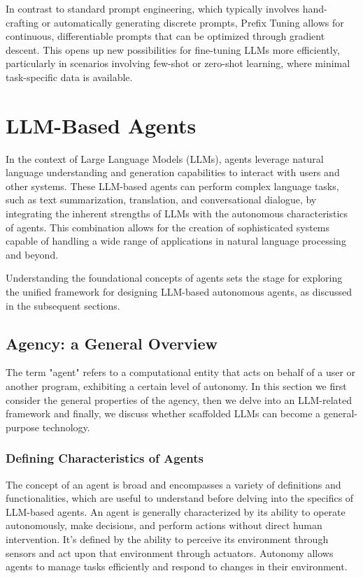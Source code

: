 In contrast to standard prompt engineering, which typically involves hand-crafting or automatically generating discrete prompts, Prefix Tuning allows for continuous, differentiable prompts that can be optimized through gradient descent. This opens up new possibilities for fine-tuning LLMs more efficiently, particularly in scenarios involving few-shot or zero-shot learning, where minimal task-specific data is available.

\section{LLM-Based Agents}
\label{sec:llmbasedagent}
In the context of Large Language Models (LLMs), agents leverage natural language understanding and generation capabilities to interact with users and other systems. These LLM-based agents can perform complex language tasks, such as text summarization, translation, and conversational dialogue, by integrating the inherent strengths of LLMs with the autonomous characteristics of agents. This combination allows for the creation of sophisticated systems capable of handling a wide range of applications in natural language processing and beyond.

Understanding the foundational concepts of agents sets the stage for exploring the unified framework for designing LLM-based autonomous agents, as discussed in the subsequent sections.

\subsection{Agency: a General Overview}

The term "agent" refers to a computational entity that acts on behalf of a user or another program, exhibiting a certain level of autonomy. In this section we first consider the general properties of the agency, then we delve into an LLM-related framework and finally, we discuss whether scaffolded LLMs can become a general-purpose technology.


\subsubsection{Defining Characteristics of Agents}
The concept of an agent is broad and encompasses a variety of definitions and functionalities, which are useful to understand before delving into the specifics of LLM-based agents.
An agent is generally characterized by its ability to operate autonomously, make decisions, and perform actions without direct human intervention. It's defined by the ability to perceive its environment through sensors and act upon that environment through actuators. Autonomy allows agents to manage tasks efficiently and respond to changes in their environment.

